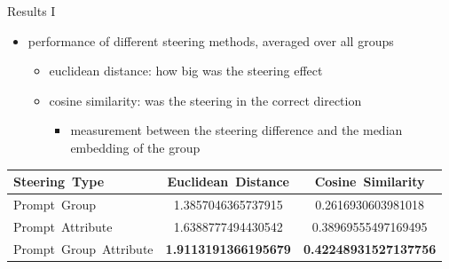\documentclass[]{beamer}
\begin{document}
\begin{frame}{Results I}
  \begin{itemize}
    \item performance of different steering methods, averaged over all groups
          \begin{itemize}
            \item euclidean distance: how big was the steering effect
            \item cosine similarity: was the steering in the correct direction
                  \begin{itemize}
                    \item measurement between the steering difference and the median embedding of the group
                  \end{itemize}
          \end{itemize}
  \end{itemize}
  \begin{tabular}{lSS}
    \toprule
    {Steering\ Type}         & {Euclidean\ Distance}                              & {Cosine\ Similarity}                                \\
    \midrule
    Prompt\ Group            & 1.3857046365737915                                 & 0.2616930603981018                                  \\
    Prompt\ Attribute        & 1.6388777494430542                                 & 0.38969555497169495                                 \\
    Prompt\ Group\ Attribute &  \bfseries 1.9113191366195679 &  \bfseries 0.42248931527137756 \\
    \bottomrule
  \end{tabular}
\end{frame}
\end{document}
